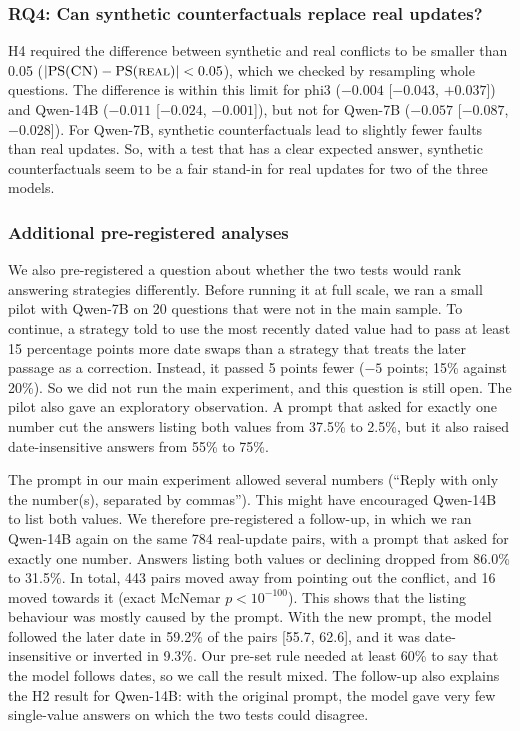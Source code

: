 \documentclass[preprint,12pt,authoryear]{elsarticle}
\newcommand{\cn}{\textsc{CN}}
\begin{document}
\subsubsection*{RQ4: Can synthetic counterfactuals replace real updates?}
H4 required the difference between synthetic and real conflicts to be smaller than 0.05
($|\mathrm{PS}(\cn) - \mathrm{PS}(\textsc{real})| < 0.05$), which we checked by resampling whole
questions. The difference is within this limit for phi3 ($-0.004$ [$-0.043$, $+0.037$]) and Qwen-14B
($-0.011$ [$-0.024$, $-0.001$]), but not for Qwen-7B ($-0.057$ [$-0.087$, $-0.028$]). For Qwen-7B,
synthetic counterfactuals lead to slightly fewer faults than real updates. So, with a test that has a
clear expected answer, synthetic counterfactuals seem to be a fair stand-in for real updates for two
of the three models.

\subsubsection*{Additional pre-registered analyses}
We also pre-registered a question about whether the two tests would rank answering strategies
differently. Before running it at full scale, we ran a small pilot with Qwen-7B on 20 questions that
were not in the main sample. To continue, a strategy told to use the most recently dated value had
to pass at least 15 percentage points more date swaps than a strategy that treats the later passage
as a correction. Instead, it passed 5 points fewer ($-5$ points; 15\% against 20\%). So we did not run
the main experiment, and this question is still open. The pilot also gave an exploratory observation. A prompt that asked for exactly one number cut the answers listing both values from
37.5\% to 2.5\%, but it also raised date-insensitive answers from 55\% to 75\%.

The prompt in our main experiment allowed several numbers (``Reply with only the number(s), separated
by commas''). This might have encouraged Qwen-14B to list both values. We therefore pre-registered a
follow-up, in which we ran Qwen-14B again on the same 784 real-update pairs, with a prompt that asked
for exactly one number. Answers listing both values or declining dropped from 86.0\% to 31.5\%. In
total, 443 pairs moved away from pointing out the conflict, and 16 moved towards it (exact McNemar
$p < 10^{-100}$). This shows that the listing behaviour was mostly caused by the prompt. With the new
prompt, the model followed the later date in 59.2\% of the pairs [55.7, 62.6], and it was
date-insensitive or inverted in 9.3\%. Our pre-set rule needed at least 60\% to say that the model
follows dates, so we call the result mixed. The follow-up also explains the H2 result for Qwen-14B:
with the original prompt, the model gave very few single-value answers on which the two tests could
disagree.
\end{document}
